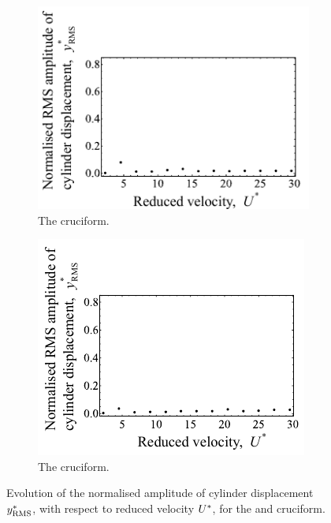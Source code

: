 \documentclass[oneside]{utmthesis}
\begin{document}
\begin{figure}
  \centering
  \begin{subfigure}[h]{0.4\textwidth}
    \includegraphics[width=\textwidth]{figs/yStrRMS2}
  \caption{The \angfo{} cruciform.}
    \label{fig:yStrRMS2}
  \end{subfigure}
  \hspace{6mm}
  \begin{subfigure}[h]{0.4\textwidth}
    \includegraphics[width=\textwidth]{figs/yStrRMS3}
    \caption{The \angth{} cruciform.}
    \label{fig:yStrRMS3}
  \end{subfigure}

  \caption{Evolution of the normalised \rms{} amplitude of cylinder displacement $y^{*}_{\text{RMS}}$, with respect to reduced velocity $U^{*}$, for the \angfo{} and \angth{} cruciform.}
  \label{fig:yStrRMS23}
\end{figure}
\end{document}
